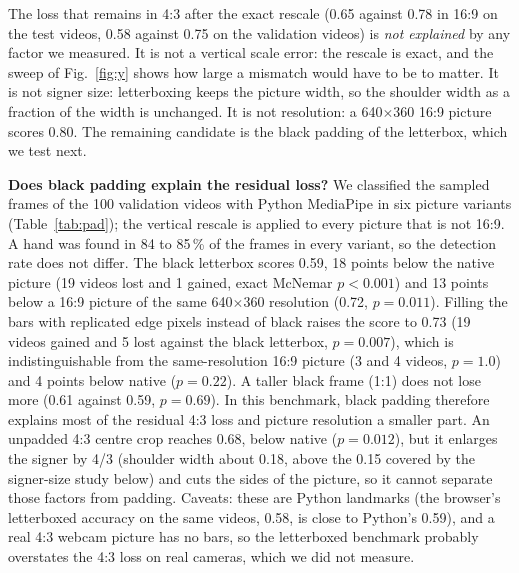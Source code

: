 \documentclass[conference]{IEEEtran}
\begin{document}
The loss that remains in 4:3 after the exact rescale (0.65 against 0.78 in 16:9 on the test videos, 0.58 against 0.75 on the validation videos) is \emph{not explained} by any factor we measured. It is not a vertical scale error: the rescale is exact, and the sweep of Fig.~\ref{fig:y} shows how large a mismatch would have to be to matter. It is not signer size: letterboxing keeps the picture width, so the shoulder width as a fraction of the width is unchanged. It is not resolution: a 640$\times$360 16:9 picture scores 0.80. The remaining candidate is the black padding of the letterbox, which we test next.

\textbf{Does black padding explain the residual loss?} We classified the sampled frames of the 100 validation videos with Python MediaPipe in six picture variants (Table~\ref{tab:pad}); the vertical rescale is applied to every picture that is not 16:9. A hand was found in 84 to 85\,\% of the frames in every variant, so the detection rate does not differ. The black letterbox scores 0.59, 18 points below the native picture (19 videos lost and 1 gained, exact McNemar $p<0.001$) and 13 points below a 16:9 picture of the same 640$\times$360 resolution (0.72, $p=0.011$). Filling the bars with replicated edge pixels instead of black raises the score to 0.73 (19 videos gained and 5 lost against the black letterbox, $p=0.007$), which is indistinguishable from the same-resolution 16:9 picture (3 and 4 videos, $p=1.0$) and 4 points below native ($p=0.22$). A taller black frame (1:1) does not lose more (0.61 against 0.59, $p=0.69$). In this benchmark, black padding therefore explains most of the residual 4:3 loss and picture resolution a smaller part. An unpadded 4:3 centre crop reaches 0.68, below native ($p=0.012$), but it enlarges the signer by 4/3 (shoulder width about 0.18, above the 0.15 covered by the signer-size study below) and cuts the sides of the picture, so it cannot separate those factors from padding. Caveats: these are Python landmarks (the browser's letterboxed accuracy on the same videos, 0.58, is close to Python's 0.59), and a real 4:3 webcam picture has no bars, so the letterboxed benchmark probably overstates the 4:3 loss on real cameras, which we did not measure.
\end{document}
